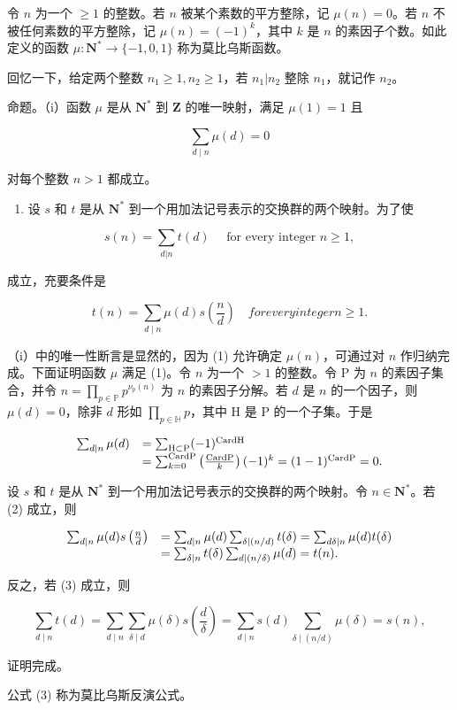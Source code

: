 
  令 \(n\) 为一个 \(\geqslant 1\) 的整数。若 \(n\) 被某个素数的平方整除，记 \(\mu(n) = 0\)。若 \(n\) 不被任何素数的平方整除，记 \(\mu(n) = (-1)^k\)，其中 \(k\) 是 \(n\) 的素因子个数。如此定义的函数 \(\mu: \mathbf{N}^* \to \{-1, 0, 1\}\) 称为莫比乌斯函数。

回忆一下，给定两个整数 \(n_1 \geqslant 1, n_2 \geqslant 1\)，若 \(n_1|n_2\) 整除 \(n_1\)，就记作 \(n_2\)。

命题。（i）函数 \(\mu\) 是从 \(\mathbf{N}^*\) 到 \(\mathbf{Z}\) 的唯一映射，满足 \(\mu(1) = 1\) 且

\[
\sum_ {d \mid n} \mu (d) = 0\tag{1}
\]

对每个整数 \(n > 1\) 都成立。

\begin{enumerate}
\def\labelenumi{(\roman{enumi})}
\setcounter{enumi}{1}
\tightlist
\item
  设 \(s\) 和 \(t\) 是从 \(\mathbf{N}^*\) 到一个用加法记号表示的交换群的两个映射。为了使
\end{enumerate}

\[
s (n) = \sum_ {d | n} t (d) \quad \text { for   every   integer } n \geqslant 1,\tag{2}
\]

成立，充要条件是

\[
t (n) = \sum_ {d \mid n} \mu (d) s \left(\frac {n}{d}\right) \quad for every integer n \geqslant 1.\tag{3}
\]

（i）中的唯一性断言是显然的，因为 (1) 允许确定 \(\mu(n)\)，可通过对 \(n\) 作归纳完成。下面证明函数 \(\mu\) 满足 (1)。令 \(n\) 为一个 \(>1\) 的整数。令 P 为 \(n\) 的素因子集合，并令 \(n = \prod_{p \in \mathbb{P}} p^{\nu_p(n)}\) 为 \(n\) 的素因子分解。若 \(d\) 是 \(n\) 的一个因子，则 \(\mu(d) = 0\)，除非 \(d\) 形如 \(\prod_{p \in \mathbb{H}} p\)，其中 H 是 P 的一个子集。于是

\[
\begin{array}{r l} \sum_ {d | n} \mu (d) & = \sum_ {\mathrm{H} \subset \mathrm{P}} (- 1) ^ {\mathrm{CardH}} \\ & = \sum_ {k = 0} ^ {\mathrm{CardP}} \left(\frac {\mathrm{CardP}}{k}\right) (- 1) ^ {k} = (1 - 1) ^ {\mathrm{CardP}} = 0. \end{array}
\]


设 \(s\) 和 \(t\) 是从 \(\mathbf{N}^*\) 到一个用加法记号表示的交换群的两个映射。令 \(n \in \mathbf{N}^*\)。若 (2) 成立，则

\[
\begin{array}{r l} \sum_ {d | n} \mu (d) s \left(\frac {n}{d}\right) & = \sum_ {d | n} \mu (d) \sum_ {\delta \mid (n / d)} t (\delta) = \sum_ {d \delta | n} \mu (d) t (\delta) \\ & = \sum_ {\delta | n} t (\delta) \sum_ {d \mid (n / \delta)} \mu (d) = t (n). \end{array}
\]

反之，若 (3) 成立，则

\[
\sum_ {d \mid n} t (d) = \sum_ {d \mid n} \sum_ {\delta \mid d} \mu (\delta) s \left(\frac {d}{\delta}\right) = \sum_ {d \mid n} s (d) \sum_ {\delta \mid (n / d)} \mu (\delta) = s (n),
\]

证明完成。

公式 (3) 称为莫比乌斯反演公式。


